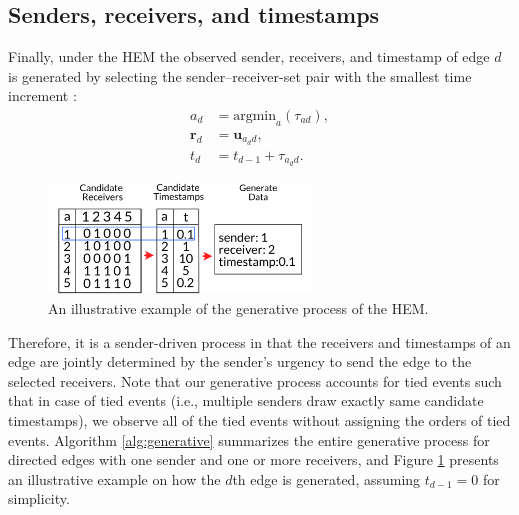 \documentclass[ba]{imsart}
\numberwithin{equation}{section}
\theoremstyle{plain}
\begin{document}
	\subsection{Senders, receivers, and timestamps}\label{subsec:Observed}
	Finally, under the HEM the observed sender, receivers, and timestamp of edge $d$ is generated by selecting the sender--receiver-set pair with the smallest time increment \citep{snijders1996stochastic}:
	\begin{equation}
		\begin{aligned}
			a_d &= \mbox{argmin}_{a}(\tau_{ad}),\\
			\boldsymbol{r}_d &= \boldsymbol{u}_{a_d d},\\
			t_d &=t_{d-1} + \tau_{a_d d}.
		\end{aligned}
	\end{equation}
	\begin{figure}[!t]
		\centering
		\includegraphics[width=0.625\textwidth]{img/diagram2.png}	
		\caption {An illustrative example of the generative process of the HEM.}
		\label{figure:diagram}
	\end{figure}	
		Therefore, it is a sender-driven process in that the receivers and timestamps of an edge are jointly determined by the sender's urgency to send the edge to the selected receivers. Note that our generative process accounts for tied events such that in case of tied events (i.e., multiple senders draw exactly same candidate timestamps), we observe all of the tied events without assigning the orders of tied events. Algorithm \ref{alg:generative} summarizes the entire generative process for directed edges with one sender and one or more receivers, and Figure \ref{figure:diagram} presents an illustrative example on how the $d$th edge is generated, assuming $t_{d-1} = 0$ for simplicity.
\end{document}
